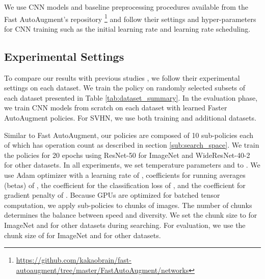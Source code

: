 \documentclass[10pt,twocolumn,letterpaper]{article}
\newcommand{\Tabref}[1]{Table \ref{#1}}
\newcommand{\autoaugment}{AutoAugment\xspace}
\newcommand{\faster}{Faster \autoaugment}
\newcommand{\fast}{Fast \autoaugment}
\begin{document}
We use CNN models and baseline preprocessing procedures available from the \fast's repository \footnote{\url{https://github.com/kakaobrain/fast-autoaugment/tree/master/FastAutoAugment/networks}} and follow their settings and hyper-parameters for CNN training such as the initial learning rate and learning rate scheduling.


\subsection{Experimental Settings}\label{sub:experimental_settings}

To compare our results with previous studies \cite{Cubuk2018,Lim2019,Ho2019}, we follow their experimental settings on each dataset. We train the policy on randomly selected subsets of each dataset presented in \Tabref{tab:dataset_summary}. In the evaluation phase, we train CNN models from scratch on each dataset with learned \faster policies. For SVHN, we use both training and additional datasets.


Similar to \fast \cite{Lim2019}, our policies are composed of 10 sub-policies each of which has operation count  as described in section \ref{sub:search_space}. We train the policies for 20 epochs using ResNet-50 for ImageNet and WideResNet-40-2 for other datasets. In all experiments, we set temperature parameters  and  to . We use Adam optimizer \cite{Kingma2015} with a learning rate of , coefficients for running averages (betas) of , the coefficient for the classification loss  of , and the coefficient for gradient penalty of . Because GPUs are optimized for batched tensor computation, we apply sub-policies to chunks of images. The number of chunks determines the balance between speed and diversity. We set the chunk size to  for ImageNet and  for other datasets during searching. For evaluation, we use the chunk size of  for ImageNet and  for other datasets.


\begin{table}[tb]
    \centering
    
    \vspace{5pt}
    \caption{Summary of datasets used in the experiments. For the policy training on ImageNet, we use only 6000 images from the 120 selected classes following \cite{Cubuk2018,Lim2019}.}
    \label{tab:dataset_summary}
\end{table}
\end{document}
